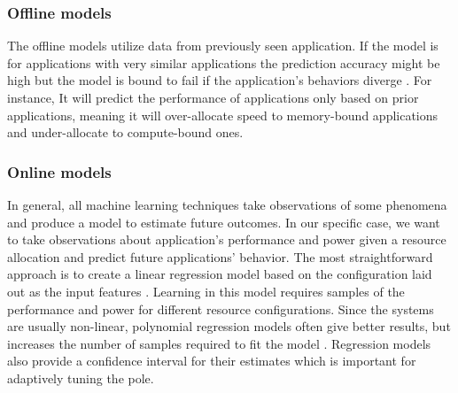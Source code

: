 \subsubsection{Offline models}
The offline models utilize data from previously seen application. If the model is for applications with very similar applications the prediction accuracy might be high but the model is bound to fail if the application's behaviors diverge \cite{meisner2011powe,Kim2014}. For instance,  It will predict the performance of applications only based on prior applications, meaning it will over-allocate speed to memory-bound applications 
and under-allocate to compute-bound ones. 

\subsubsection{Online models}
  In general, all
machine learning techniques take observations of some phenomena and
produce a model to estimate future outcomes.  In our specific case, we
want to take observations about application's performance and power
given a resource allocation and predict future applications' behavior. 
The most straightforward approach is to create a linear regression
model based on the configuration laid out as the input features
\cite{}. Learning in this model requires samples of the performance
and power for different resource configurations. Since the systems are
usually non-linear, polynomial regression models often give better
results, but increases the number of samples required to fit the model
\cite{lee2008efficiency}. Regression models also provide a confidence interval for their estimates which is important for adaptively tuning the pole.

